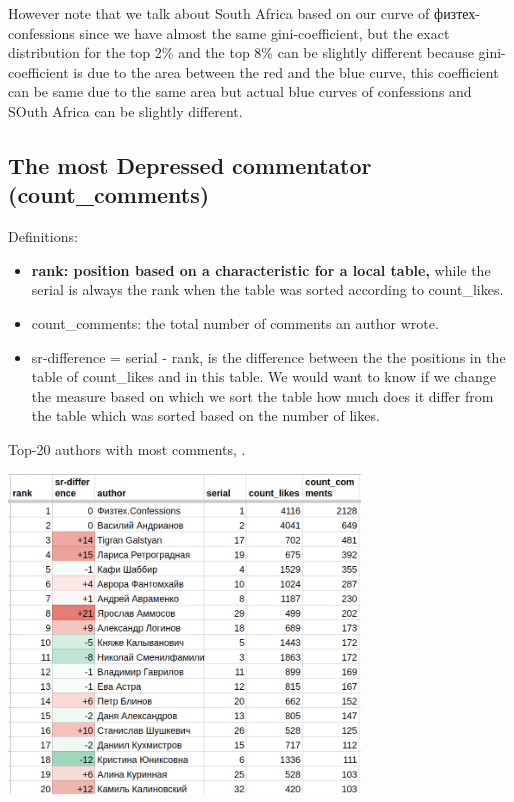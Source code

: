 \documentclass[
	12pt
] {article}
\begin{document}
	However note that we talk about South Africa based on our curve of физтех-confessions since we have almost the same gini-coefficient, but the exact distribution for the top \num{2}\% and the top \num{8}\% can be slightly different because gini-coefficient is due to the area between the red and the blue curve, this coefficient can be same due to the same area but actual blue curves of confessions and SOuth Africa can be slightly different.

\subsection{The most Depressed commentator (count\_comments)}
	Definitions:
	\begin{itemize}
		\item \textbf{rank: position based on a characteristic for a local table,} while the serial is always the rank when the table was sorted according to count\_likes.
		\item count\_comments: the total number of comments an author wrote.
		\item sr-difference = serial - rank, is the difference between the the positions in the table of count\_likes and in this table. We would want to know if we change the measure based on which we sort the table how much does it differ from the table which was sorted based on the number of likes.
	\end{itemize}

	\begin{table}[H]
		\centering
		\caption{Top-20 authors with most comments, \cite{sheet-count-comments}.}
		\label{table-count-comments}
		\includegraphics[width=0.7\textwidth]{table-count-comments-818}
	\end{table}
\end{document}
